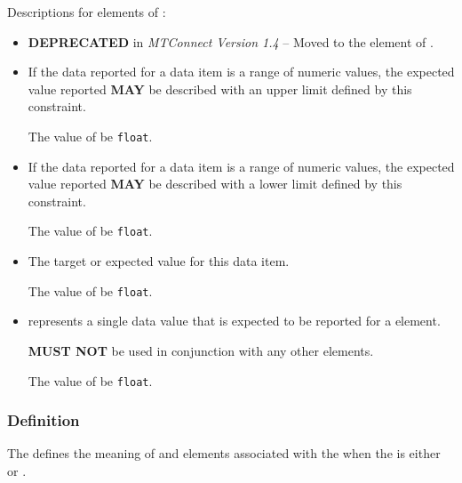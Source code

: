 Descriptions for elements of :

\begin{itemize}

\item {} \newline \textbf{DEPRECATED} in \textit{MTConnect Version 1.4} – Moved to the
 element of .

\item {} \newline If the data reported for a data item is a range of numeric values, the expected value reported \textbf{MAY} be described with an upper limit defined by this constraint.

The value of  \MUST be \texttt{float}.

\item {} \newline If the data reported for a data item is a range of numeric values, the expected value reported \textbf{MAY} be described with a lower limit defined by this constraint.

The value of  \MUST be \texttt{float}.

\item {} \newline The target or expected value for this data item.

The value of  \MUST be \texttt{float}.

\item {} \newline {} represents a single data value that is expected to be reported for a  element.

 \textbf{MUST NOT} be used in conjunction with any other  elements.

The value of  \MUST be \texttt{float}.
\end{itemize}



\subsubsection{Definition}
\label{sec:Definition}



The  defines the meaning of  and  elements associated with the  when the  is either  or .


